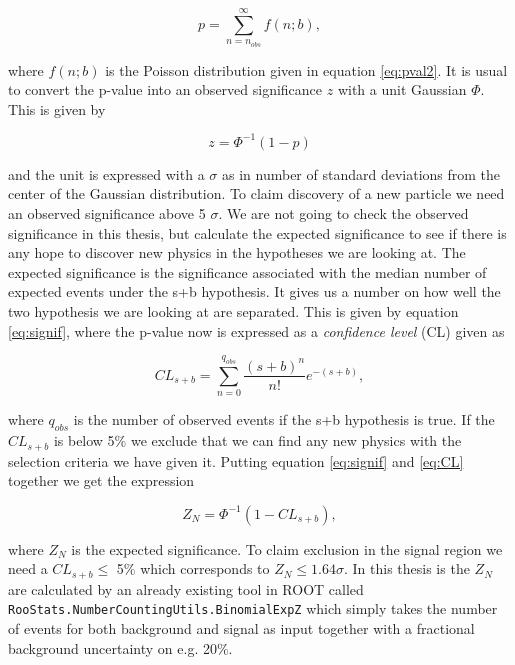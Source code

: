 \begin{equation}
    \label{eq:pvalues}
    p = \sum_{n=n_{obs}}^\infty f(n;b),
\end{equation}


where $f(n;b)$ is the Poisson distribution given in equation \ref{eq:pval2}. It is usual to convert the p-value into an observed significance $z$ with a unit Gaussian $\Phi$. This is given by

\begin{equation}
    \label{eq:signif}
    z = \Phi^{-1}(1-p)
\end{equation}

 and the unit is expressed with a $\sigma$ as in number of standard deviations from the center of the Gaussian distribution. To claim discovery of a new particle we need an observed significance above 5 $\sigma$. We are not going to check the observed significance in this thesis, but calculate the expected significance to see if there is any hope to discover new physics in the hypotheses we are looking at. The expected significance is the significance associated with the median number of expected events under the s+b hypothesis. It gives us a number on how well the two hypothesis we are looking at are separated. This is given by equation \ref{eq:signif}, where the p-value now is expressed as a \textit{confidence level} (CL) given as
 
 \begin{equation}
    \label{eq:CL}
    CL_{s+b} = \sum_{n=0}^{q_{obs}} \frac{(s+b)^n}{n!} e^{-(s+b)},
 \end{equation}

where $q_{obs}$ is the number of observed events if the s+b hypothesis is true. If the $CL_{s+b}$ is below 5\% we exclude that we can find any new physics with the selection criteria we have given it. Putting equation \ref{eq:signif} and \ref{eq:CL} together we get the expression

\begin{equation}
    \label{eq:signif}
    Z_N = \Phi^{-1}(1-CL_{s+b}),
\end{equation}

where $Z_N$ is the expected significance. To claim exclusion in the signal region we need a $CL_{s+b} \leq$ 5\% which corresponds to $Z_N \leq 1.64 \sigma$. In this thesis is the $Z_N$ are calculated by an already existing tool in ROOT called \texttt{RooStats.NumberCountingUtils.BinomialExpZ} which simply takes the number of events for both background and signal as input together with a fractional background uncertainty on e.g. 20\%.







